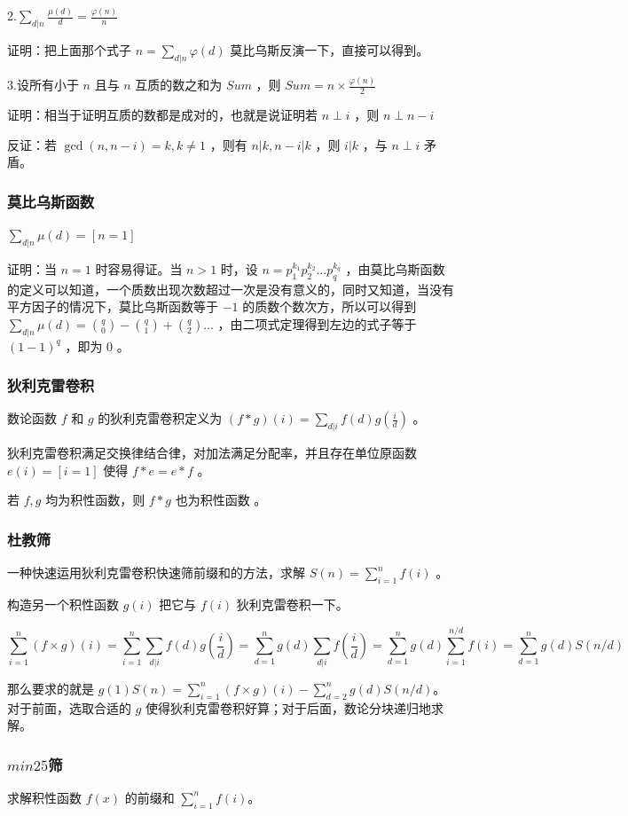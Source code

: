 \documentclass[UTF-8]{ctexart}
\begin{document}
	2.$\sum _ {d|n} \frac{\mu(d)}{d}=\frac{\varphi(n)}{n}$
	
	证明：把上面那个式子 $n=\sum _ {d|n} \varphi(d)$ 莫比乌斯反演一下，直接可以得到。
	
	3.设所有小于 $n$ 且与 $n$ 互质的数之和为 $Sum$ ，则 $Sum=n \times \frac{\varphi(n)}{2}$
	
	证明：相当于证明互质的数都是成对的，也就是说证明若 $n \perp i$ ，则 $n \perp n-i$ 
	 
	反证：若 $\gcd(n,n-i)=k,k \neq 1$ ，则有 $n|k,n-i|k$ ，则 $i|k$ ，与 $n \perp i$ 矛盾。
	\subsubsection{莫比乌斯函数}
	$\sum _ {d|n} \mu(d)=[n=1]$ 
	
	证明：当 $n=1$ 时容易得证。当 $n > 1$ 时，设 $n=p _ 1 ^ {k _ 1} p _ 2 ^ {k _ 2} \dots p _ q ^ {k _ q}$ ，由莫比乌斯函数的定义可以知道，一个质数出现次数超过一次是没有意义的，同时又知道，当没有平方因子的情况下，莫比乌斯函数等于 $-1$ 的质数个数次方，所以可以得到 $\sum _ {d|n} \mu(d)= \binom{q}{0}-\binom{q}{1}+\binom{q}{2} \dots $ ，由二项式定理得到左边的式子等于 $(1-1) ^ q$ ，即为 $0$ 。
	\subsubsection{狄利克雷卷积}
	数论函数 $f$ 和 $g$ 的狄利克雷卷积定义为 $(f * g)(i)=\sum _ {d|i} f(d)g(\frac{i}{d})$ 。
	
	狄利克雷卷积满足交换律结合律，对加法满足分配率，并且存在单位原函数 $e(i)=[i=1]$ 使得 $f * e=e * f$ 。  
	
	若 $f,g$ 均为积性函数，则 $f * g$ 也为积性函数 。
	\subsubsection{杜教筛}
	一种快速运用狄利克雷卷积快速筛前缀和的方法，求解 $S(n)=\sum_{i=1}^n f(i)$ 。
	
	构造另一个积性函数 $g(i)$ 把它与 $f(i)$ 狄利克雷卷积一下。
	
	$$\sum_{i=1}^n (f\times g)(i)=\sum_{i=1}^n \sum_{d|i} f(d)g(\frac{i}{d}) 
	=\sum_{d=1}^n g(d) \sum_{d|i} f(\frac{i}{d}) =\sum_{d=1}^{n} g(d)\sum_{i=1}^{n/d} f(i)=\sum_{d=1}^n g(d)S(n/d)$$
	
	那么要求的就是 $g(1)S(n)=\sum_{i=1}^n (f\times g)(i)-\sum_{d=2}^n g(d)S(n/d)$。对于前面，选取合适的 $g$ 使得狄利克雷卷积好算；对于后面，数论分块递归地求解。
	
	\subsubsection{$min25$筛}
	求解积性函数 $f(x)$ 的前缀和 $\sum _ {i=1} ^ n f(i)$。
	
\end{document}
